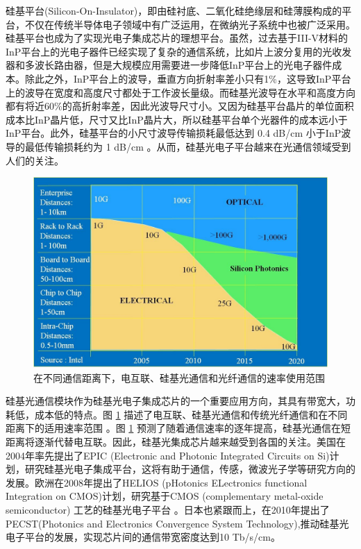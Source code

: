 硅基平台(Silicon-On-Insulator)，即由硅衬底、二氧化硅绝缘层和硅薄膜构成的平台，不仅在传统半导体电子领域中有广泛运用，在微纳光子系统中也被广泛采用。硅基平台也成为了实现光电子集成芯片的理想平台。虽然，过去基于III-V材料的InP平台上的光电子器件已经实现了复杂的通信系统\cite{Meint2014an}，比如片上波分复用的光收发器和多波长路由器，但是大规模应用需要进一步降低InP平台上的光电子器件成本。除此之外，InP平台上的波导，垂直方向折射率差小只有1\%，这导致InP平台上的波导在宽度和高度尺寸都处于工作波长量级。而硅基光波导在水平和高度方向都有将近60\%的高折射率差，因此光波导尺寸小。又因为硅基平台晶片的单位面积成本比InP晶片低，尺寸又比InP晶片大，所以硅基平台单个光器件的成本远小于InP平台。此外，硅基平台的小尺寸波导传输损耗最低达到 0.4 dB/cm \cite{Tsuyoshi2016low} 小于InP波导的最低传输损耗约为 1 dB/cm \cite{Meint2014an}。从而，硅基光电子平台越来在光通信领域受到人们的关注。
\begin{figure}[htb]
	\centering
	\includegraphics[width=12cm]{./Pictures/figure1.jpg}
	\caption{在不同通信距离下，电互联、硅基光通信和光纤通信的速率使用范围 \cite{Zuffada2012}}
	\label{figure1}
\end{figure}

硅基光通信模块作为硅基光电子集成芯片的一个重要应用方向，其具有带宽大，功耗低，成本低的特点。图 \ref{figure1} 描述了电互联、硅基光通信和传统光纤通信和在不同距离下的适用速率范围 \cite{Zuffada2012}。图 \ref{figure1} 预测了随着通信速率的逐年提高，硅基光通信在短距离将逐渐代替电互联。因此，硅基光集成芯片越来越受到各国的关注。美国在2004年率先提出了EPIC (Electronic and Photonic Integrated Circuits on Si)计划，研究硅基光电子集成平台，这将有助于通信，传感，微波光子学等研究方向的发展\cite{Shah2005}。欧洲在2008年提出了HELIOS (pHotonics ELectronics functional Integration on CMOS)计划，研究基于CMOS (complementary metal-oxide semiconductor) 工艺的硅基光电子平台 \cite{HELIOS}。日本也紧跟而上，在2010年提出了PECST(Photonics and Electronics Convergence System Technology),推动硅基光电子平台的发展，实现芯片间的通信带宽密度达到10 Tb/s/cm\cite{Arakawa2013Silicon}。


